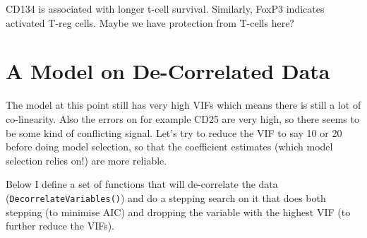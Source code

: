 \documentclass[a4paper]{article}\usepackage[]{graphicx}\usepackage[]{color}
\begin{document}
CD134 is associated with longer t-cell survival. Similarly, FoxP3 indicates activated T-reg cells. Maybe we have protection from T-cells here?

\section{A Model on De-Correlated Data}
The model at this point still has very high VIFs which means there is still a lot of co-linearity. Also the errors on for example CD25 are very high, so there seems to be some kind of conflicting signal. Let's try to reduce the VIF to say 10 or 20 before doing model selection, so that the coefficient estimates (which model selection relies on!) are more reliable.

Below I define a set of functions that will de-correlate the data (\texttt{DecorrelateVariables()}) and do a stepping search on it that does both stepping (to minimise AIC) and dropping the variable with the highest VIF (to further reduce the VIFs).
\end{document}
